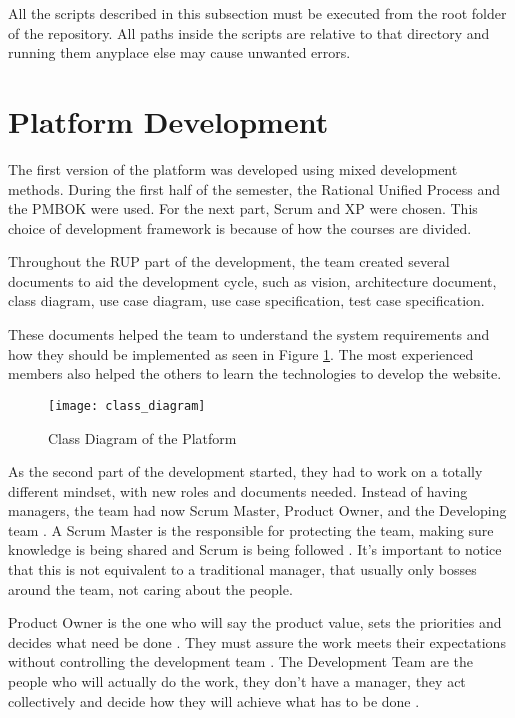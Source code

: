 All the scripts described in this subsection must be executed from the root folder of the repository. All paths inside the scripts are relative to that directory and running them anyplace else may cause unwanted errors.



\section{Platform Development}
\label{sec:platform_development}

The first version of the platform was developed using mixed development methods. During the first half of the semester, the Rational Unified Process and the PMBOK were used. For the next part, Scrum and XP were chosen. This choice of development framework is because of how the courses are divided.

Throughout the RUP part of the development, the team created several documents to aid the development cycle, such as vision, architecture document, class diagram, use case diagram, use case specification, test case specification.

These documents helped the team to understand the system requirements and how they should be implemented as seen in Figure \ref{fig:class_diagram}. The most experienced members also helped the others to learn the technologies to develop the website.


\begin{figure}[h!]
\centering
\texttt{[image: class\_diagram]}
\caption{Class Diagram of the Platform \cite{plataforma2017arquitetura}}
\label{fig:class_diagram}
\end{figure}

As the second part of the development started, they had to work on a totally different mindset, with new roles and documents needed. Instead of having managers, the team had now Scrum Master, Product Owner, and the Developing team \cite{agile422017}. A Scrum Master is the responsible for protecting the team, making sure knowledge is being shared and Scrum is being followed \cite{scrumalliance2017}. It's important to notice that this is not equivalent to a traditional manager, that usually only bosses around the team, not caring about the people.

Product Owner is the one who will say the product value, sets the priorities and decides what need be done \cite{agile422017}. They must assure the work meets their expectations without controlling the development team \cite{scrumalliance2017}. The Development Team are the people who will actually do the work, they don't have a manager, they act collectively and decide how they will achieve what has to be done \cite{scrumalliance2017}.

